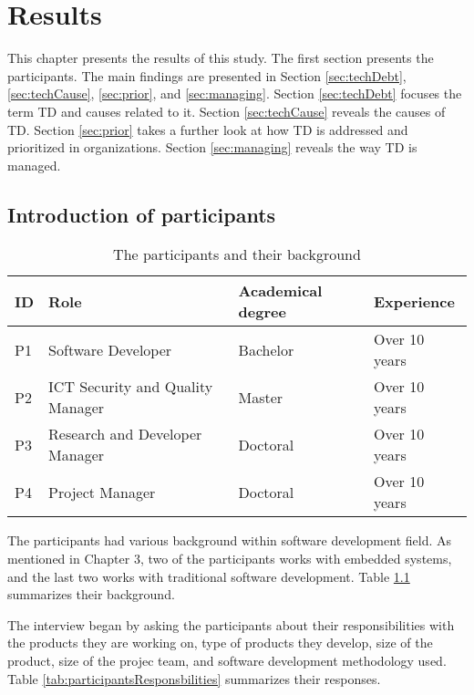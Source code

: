 \chapter{Results}
This chapter presents the results of this study. The first section presents the participants. The main findings are presented in Section \ref{sec:techDebt}, \ref{sec:techCause}, \ref{sec:prior}, and \ref{sec:managing}. Section \ref{sec:techDebt} focuses the term TD and causes related to it. Section \ref{sec:techCause} reveals the causes of TD. Section \ref{sec:prior} takes a further look at how TD is addressed and prioritized in organizations. Section \ref{sec:managing} reveals the way TD is managed.

\section{Introduction of participants}
\label{sec:background}

\begin{table}[ht!]
	\centering
    \begin{tabular}{|p{1cm}|p{4cm}|p{4cm}|p{4cm}|}
    \hline
    \textbf{ID} & \textbf{Role} & \textbf{Academical degree} & \textbf{Experience}    \\ \hline
    P1 & Software Developer               & Bachelor          & Over 10 years \\ \hline
    P2 & ICT Security and Quality Manager & Master            & Over 10 years \\ \hline
    P3 & Research and Developer Manager   & Doctoral          & Over 10 years \\ \hline
    P4 & Project Manager                  & Doctoral          & Over 10 years \\ \hline
    \end{tabular}
    \caption{The participants and their background} \label{tab:participants}
\end{table}

The participants had various background within software development field. As mentioned in Chapter 3, two of the participants works with embedded systems, and the last two works with traditional software development. Table \ref{tab:participants} summarizes their background.

The interview began by asking the participants about their responsibilities with the products they are working on, type of products they develop, size of the product, size of the projec team, and software development methodology used. Table \ref{tab:participantsResponsbilities} summarizes their responses.

